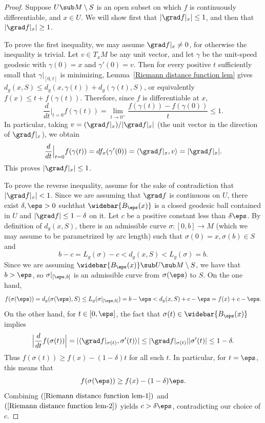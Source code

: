 \begin{proof}
Suppose $U\sub M\setminus S$ is an open subset on which $f$ is continuously differentiable, and $x\in U$. We will show first that $|\grad f|_x|\leq 1$, and then that $|\grad f|_x|\geq 1$.\par
To prove the first inequality, we may assume $\grad f|_x\neq 0$, for otherwise the inequality is trivial. Let $v\in T_xM$ be any unit vector, and let $\gamma$ be the unit-speed 
geodesic with $\gamma(0)=x$ and $\gamma'(0)=v$. Then for every positive $t$ sufficiently small that $\gamma|_{[0,t]}$ is minimizing, Lemma~\ref{Riemann distance function lem} gives 
$d_g(x,S)\leq d_g(x,\gamma(t))+d_g(\gamma(t),S)$,  or equivalently $f(x)\leq t+f(\gamma(t))$. Therefore, since $f$ is differentiable at $x$,
\[\frac{d}{dt}\Big|_{t=0}f(\gamma(t))=\lim_{t\to 0^+}\frac{f(\gamma(t))-f(\gamma(0))}{t}\leq 1.\]
In particular, taking $v=(\grad f|_x)/|\grad f|_x|$ (the unit vector in the direction of $\grad f|_x$), we obtain
\[\frac{d}{dt}\Big|_{t=0}f(\gamma(t))=df_x(\gamma'(0))=\langle\grad f|_x,v\rangle=|\grad f|_x|.\]
This proves $|\grad f|_x|\leq 1$.\par
To prove the reverse inequality, assume for the sake of contradiction that $|\grad f|_x|<1$. Since we are assuming that $\grad f$ is continuous on $U$, there exist $\delta,\eps>0$ 
suchthat $\widebar{B_\eps(x)}$ is a closed geodesic ball contained in $U$ and $|\grad f|\leq 1-\delta$ on it. Let $c$ be a positive constant less than $\delta\eps$. By 
definition of $d_g(x,S)$, there is an admissible curve $\sigma:[0,b]\to M$ (which we may assume to be parametrized by arc length) such that $\sigma(0)=x,\sigma(b)\in S$ and
\[b-c=L_g(\sigma)-c<d_g(x,S)<L_g(\sigma)=b.\]
Since we are assuming $\widebar{B_\eps(x)}\sub U\sub M\setminus S$, we have that $b>\eps$, so $\sigma|_{[\eps,b]}$ is an admissible curve from $\sigma(\eps)$ to $S$. On 
the one hand,
\begin{align}\label{Riemann distance function lem-1}
f(\sigma(\eps))=d_g(\sigma(\eps),S)\leq L_g(\sigma|_{[\eps,b]})=b-\eps<d_g(x,S)+c-\eps=f(x)+c-\eps.
\end{align}
On the other hand, for $t\in[0,\eps]$, the fact that $\sigma(t)\in\widebar{B_\eps(x)}$ implies
\[\Big|\frac{d}{dt}f(\sigma(t))\Big|=|\langle\grad f|_{\sigma(t)},\sigma'(t)\rangle|\leq|\grad f|_{\sigma(t)}||\sigma'(t)|\leq 1-\delta.\]
Thus $f(\sigma(t))\geq f(x)-(1-\delta)t$ for all such $t$. In particular, for $t=\eps$, this means that
\begin{align}\label{Riemann distance function lem-2}
f(\sigma(\eps))\geq f(x)-(1-\delta)\eps.
\end{align}
Combining $(\ref{Riemann distance function lem-1})$ and $(\ref{Riemann distance function lem-2})$ yields $c>\delta\eps$, contradicting our choice of $c$.
\end{proof}
